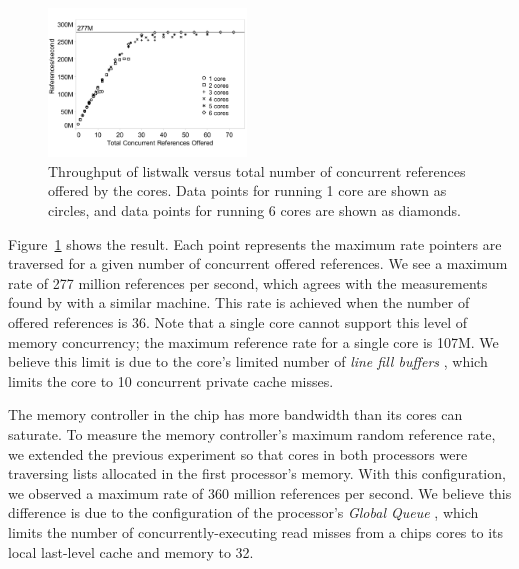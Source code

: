 \documentclass[10pt,nocopyrightspace,preprint]{sigplanconf}
\begin{document}
\begin{figure}[h]
	\begin{center}
		\includegraphics[width=0.47\textwidth]{figures/multi-listwalk-totalconc-edited.pdf}
	\end{center}
	\caption{Throughput of listwalk versus total number of
          concurrent references offered by the cores. Data points for
          running 1 core are shown as circles, and data points for
          running 6 cores are shown as diamonds. 
        }
	\label{fig:listwalk-totalconc}
\end{figure}

Figure~\ref{fig:listwalk-totalconc} shows the result. Each point represents
the maximum rate pointers are traversed for a given number of
concurrent offered references. We see a maximum rate of 277 million
references per second, which agrees with the measurements found by \cite{Mandal:2010} with a similar machine. This rate is achieved when the number of offered references is 36. Note that a single core cannot support this level of
memory concurrency; the maximum reference rate for a single core is
107M. We believe this limit is due to the core's limited number of {\em line fill
  buffers} \cite{nehalem:arch}, which limits the core to 10
concurrent private cache misses.

The memory controller in the chip has more bandwidth than its
cores can saturate. To measure the memory controller's maximum random
reference rate, we extended the previous experiment so that cores in
both processors were traversing lists allocated in the first processor's
memory. With this configuration, we observed a maximum rate of 360
million references per second. We believe this difference is due to
the configuration of the processor's {\em Global Queue} \cite{nehalem:perf}, which limits the number of concurrently-executing read misses from a chips cores to its local last-level cache and memory to 32.
\end{document}
